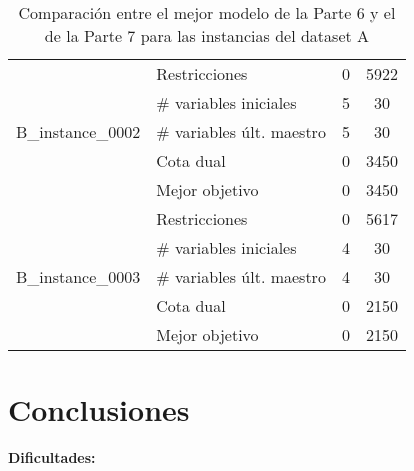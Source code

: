 \documentclass[a4paper,12pt]{article}
\begin{document}
\begin{table}[h!]
\begin{tabularx}{\textwidth}{lXcc}
\midrule
  \multirow{5}{*}{B\_instance\_0002} 
  & Restricciones               & 0   & 5922   \\
  & \# variables iniciales      & 5   & 30   \\
  & \# variables últ. maestro   & 5   & 30   \\
  & Cota dual                   & 0   & 3450   \\
  & Mejor objetivo              & 0   & 3450   \\
\midrule
\multirow{5}{*}{B\_instance\_0003} 
  & Restricciones               & 0   & 5617   \\
  & \# variables iniciales      & 4   & 30   \\
  & \# variables últ. maestro   & 4   & 30   \\
  & Cota dual                   & 0   & 2150   \\
  & Mejor objetivo              & 0   & 2150   \\
\bottomrule
\end{tabularx}
\caption{Comparación entre el mejor modelo de la Parte 6 y el de la Parte 7 para las instancias del dataset A}
\end{table}

\clearpage
\section{Conclusiones}

\textbf{Dificultades:}
\end{document}
